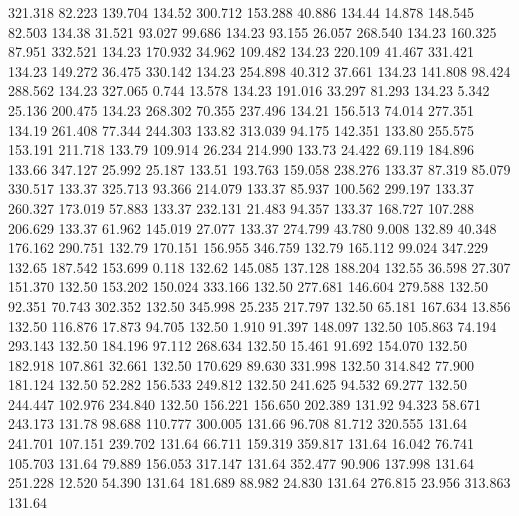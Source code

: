  321.318   82.223  139.704       134.52
 300.712  153.288   40.886       134.44
  14.878  148.545   82.503       134.38
  31.521   93.027   99.686       134.23
  93.155   26.057  268.540       134.23
 160.325   87.951  332.521       134.23
 170.932   34.962  109.482       134.23
 220.109   41.467  331.421       134.23
 149.272   36.475  330.142       134.23
 254.898   40.312   37.661       134.23
 141.808   98.424  288.562       134.23
 327.065    0.744   13.578       134.23
 191.016   33.297   81.293       134.23
   5.342   25.136  200.475       134.23
 268.302   70.355  237.496       134.21
 156.513   74.014  277.351       134.19
 261.408   77.344  244.303       133.82
 313.039   94.175  142.351       133.80
 255.575  153.191  211.718       133.79
 109.914   26.234  214.990       133.73
  24.422   69.119  184.896       133.66
 347.127   25.992   25.187       133.51
 193.763  159.058  238.276       133.37
  87.319   85.079  330.517       133.37
 325.713   93.366  214.079       133.37
  85.937  100.562  299.197       133.37
 260.327  173.019   57.883       133.37
 232.131   21.483   94.357       133.37
 168.727  107.288  206.629       133.37
  61.962  145.019   27.077       133.37
 274.799   43.780    9.008       132.89
  40.348  176.162  290.751       132.79
 170.151  156.955  346.759       132.79
 165.112   99.024  347.229       132.65
 187.542  153.699    0.118       132.62
 145.085  137.128  188.204       132.55
  36.598   27.307  151.370       132.50
 153.202  150.024  333.166       132.50
 277.681  146.604  279.588       132.50
  92.351   70.743  302.352       132.50
 345.998   25.235  217.797       132.50
  65.181  167.634   13.856       132.50
 116.876   17.873   94.705       132.50
   1.910   91.397  148.097       132.50
 105.863   74.194  293.143       132.50
 184.196   97.112  268.634       132.50
  15.461   91.692  154.070       132.50
 182.918  107.861   32.661       132.50
 170.629   89.630  331.998       132.50
 314.842   77.900  181.124       132.50
  52.282  156.533  249.812       132.50
 241.625   94.532   69.277       132.50
 244.447  102.976  234.840       132.50
 156.221  156.650  202.389       131.92
  94.323   58.671  243.173       131.78
  98.688  110.777  300.005       131.66
  96.708   81.712  320.555       131.64
 241.701  107.151  239.702       131.64
  66.711  159.319  359.817       131.64
  16.042   76.741  105.703       131.64
  79.889  156.053  317.147       131.64
 352.477   90.906  137.998       131.64
 251.228   12.520   54.390       131.64
 181.689   88.982   24.830       131.64
 276.815   23.956  313.863       131.64
